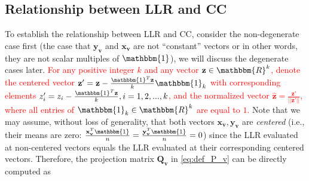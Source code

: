\subsection{Relationship between LLR and CC}
To establish the relationship between LLR and CC, consider the non-degenerate case first (the case that $\mathbf{y}_{\mathbf{v}}$ and $\mathbf{x}_{\mathbf{v}}$ are not ``constant'' vectors or in other words, they are not scalar multiples of $\mathbbm{1}$), we will discuss the degenerate cases later. \textcolor{red}{For any positive integer $k$ and any vector $\mathbf{z}\in \mathbbm{R}^{k}$, denote the centered vector $\mathbf{z}' = \mathbf{z} - \frac{\mathbbm{1}^{T}\mathbf{z}}{k}\mathbbm{1}_{k}$ with corresponding elements $z_{i}'=z_{i} - \frac{\mathbbm{1}^{T}\mathbf{z}}{k}, i=1,2,...,k$, and the normalized vector $\widehat{\mathbf{z}} = \frac{\mathbf{z}'}{||\mathbf{z}'||}$, where all entries of $\mathbbm{1}_{k}\in \mathbbm{R}^{k}$ are equal to $1$.} Note that we may assume, without loss of generality, that both vectors $\mathbf{x}_{\mathbf{v}}, \mathbf{y}_{\mathbf{v}}$ are \emph{centered} (i.e., their means are zero: $\frac{\mathbf{x}_{\mathbf{v}}^{T}\mathbbm{1}}{n} = \frac{\mathbf{y}_{\mathbf{v}}^{T}\mathbbm{1}}{n} = 0$) since the LLR evaluated at non-centered vectors equals the LLR evaluated at their corresponding centered vectors. Therefore, the projection matrix $\mathbf{Q}_{\mathbf{v}}$ in \eqref{eq:def_P_v} can be directly computed as

